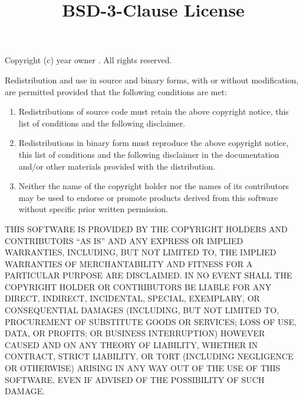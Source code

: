 \documentclass[a4paper, 12pt]{article}
\begin{document}
\title{BSD-3-Clause License}
\date{}

\maketitle

Copyright (c) \textlangle{}year\textrangle{} \textlangle{}owner\textrangle{} . All rights reserved.

\vspace{0.3cm}

Redistribution and use in source and binary forms, with or without modification, are permitted provided that the following conditions are met:

\begin{enumerate}
\item Redistributions of source code must retain the above copyright notice, this list of conditions and the following disclaimer.
\item Redistributions in binary form must reproduce the above copyright notice, this list of conditions and the following disclaimer in the documentation and/or other materials provided with the distribution.
\item Neither the name of the copyright holder nor the names of its contributors may be used to endorse or promote products derived from this software without specific prior written permission.
\end{enumerate}

THIS SOFTWARE IS PROVIDED BY THE COPYRIGHT HOLDERS AND CONTRIBUTORS ``AS IS'' AND ANY EXPRESS OR IMPLIED WARRANTIES, INCLUDING, BUT NOT LIMITED TO, THE IMPLIED WARRANTIES OF MERCHANTABILITY AND FITNESS FOR A PARTICULAR PURPOSE ARE DISCLAIMED. IN NO EVENT SHALL THE COPYRIGHT HOLDER OR CONTRIBUTORS BE LIABLE FOR ANY DIRECT, INDIRECT, INCIDENTAL, SPECIAL, EXEMPLARY, OR CONSEQUENTIAL DAMAGES (INCLUDING, BUT NOT LIMITED TO, PROCUREMENT OF SUBSTITUTE GOODS OR SERVICES; LOSS OF USE, DATA, OR PROFITS; OR BUSINESS INTERRUPTION) HOWEVER CAUSED AND ON ANY THEORY OF LIABILITY, WHETHER IN CONTRACT, STRICT LIABILITY, OR TORT (INCLUDING NEGLIGENCE OR OTHERWISE) ARISING IN ANY WAY OUT OF THE USE OF THIS SOFTWARE, EVEN IF ADVISED OF THE POSSIBILITY OF SUCH DAMAGE.
\end{document}
